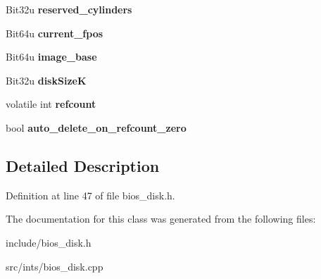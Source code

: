 \begin{DoxyCompactItemize}
\item 
\hypertarget{classimageDisk_a6588490a427230feac862942f34e401b}{Bit32u {\bfseries reserved\-\_\-cylinders}}\label{classimageDisk_a6588490a427230feac862942f34e401b}

\item 
\hypertarget{classimageDisk_afee451f676f8572279bc2354cead2bd9}{Bit64u {\bfseries current\-\_\-fpos}}\label{classimageDisk_afee451f676f8572279bc2354cead2bd9}

\item 
\hypertarget{classimageDisk_aa12b7c8c8b8bc9745dd93a10d13d89b9}{Bit64u {\bfseries image\-\_\-base}}\label{classimageDisk_aa12b7c8c8b8bc9745dd93a10d13d89b9}

\item 
\hypertarget{classimageDisk_a3a3603c680c9bbcf8206b13cf6d0f335}{Bit32u {\bfseries disk\-Size\-K}}\label{classimageDisk_a3a3603c680c9bbcf8206b13cf6d0f335}

\item 
\hypertarget{classimageDisk_a81222a3e8c9252b1737d13be03ca6bed}{volatile int {\bfseries refcount}}\label{classimageDisk_a81222a3e8c9252b1737d13be03ca6bed}

\item 
\hypertarget{classimageDisk_a94ba3581ff2159062036f478c41f889e}{bool {\bfseries auto\-\_\-delete\-\_\-on\-\_\-refcount\-\_\-zero}}\label{classimageDisk_a94ba3581ff2159062036f478c41f889e}

\end{DoxyCompactItemize}


\subsection{Detailed Description}


Definition at line 47 of file bios\-\_\-disk.\-h.



The documentation for this class was generated from the following files\-:\begin{DoxyCompactItemize}
\item 
include/bios\-\_\-disk.\-h\item 
src/ints/bios\-\_\-disk.\-cpp\end{DoxyCompactItemize}
